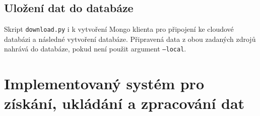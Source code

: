 \documentclass[11pt, a4paper]{article}
\theoremstyle{definition}
\theoremstyle{plain}
\begin{document}
\subsection{Uložení dat do databáze}
Skript \texttt{download.py} i k vytvoření Mongo klienta pro připojení ke cloudové databázi a následné vytvoření databáze. Připravená data z obou zadaných zdrojů nahrává do databáze, pokud není použit argument \texttt{--local}. 

\section{Implementovaný systém pro získání, ukládání a zpracování dat}
\end{document}
